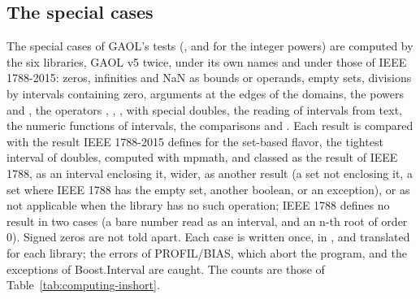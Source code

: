 \documentclass[12pt,a4paper,twoside,openright]{book}
\begin{document}
\subsection{The special cases}
\label{sec:computing-special-cases}
%

The special cases of GAOL's tests (, and
 for the integer powers) are computed by the six
libraries, GAOL v5 twice, under its own names and under those of IEEE
1788-2015: zeros, infinities and NaN as bounds or operands, empty sets,
divisions by intervals containing zero, arguments at the edges of the
domains, the powers  and , the operators \code{+=},
\code{-=}, \code{*=}, \code{/=} with special doubles, the reading of
intervals from text, the numeric functions of intervals, the comparisons
and . Each result is compared with the result IEEE 1788-2015
defines for the set-based flavor, the tightest interval of doubles, computed
with mpmath, and classed as the result of IEEE 1788, as an interval
enclosing it, wider, as another result (a set not enclosing it, a set where
IEEE 1788 has the empty set, another boolean, or an exception), or as not
applicable when the library has no such operation; IEEE 1788 defines no
result in two cases (a bare number read as an interval, and an n-th root of order 0). Signed zeros are not told apart. Each case is written
once, in , and translated for each library; the errors
of PROFIL/BIAS, which abort the program, and the exceptions of
Boost.Interval are caught. The counts are those of
Table~\ref{tab:computing-inshort}.
\end{document}
